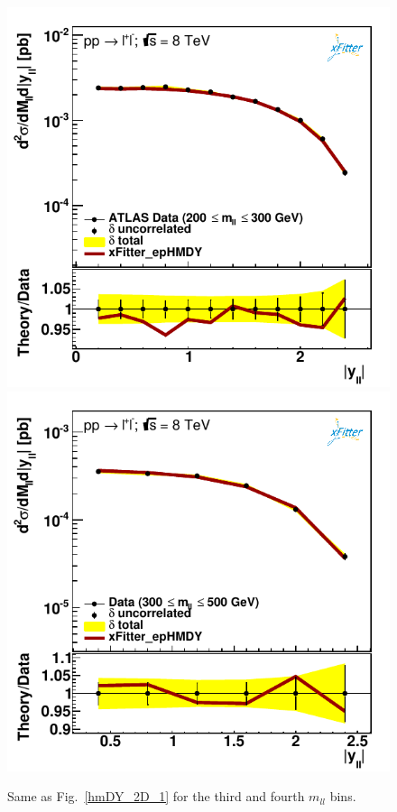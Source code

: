 \begin{figure}[t]
\centering
\includegraphics[width=14cm]{figs/data_403-1.pdf}\\
\includegraphics[width=14cm]{figs/data_404-1.pdf}
\caption{Same as Fig.~\ref{hmDY_2D_1} for the third and fourth $m_{ll}$ bins.
}
\label{hmDY_2D_2}
\end{figure}

